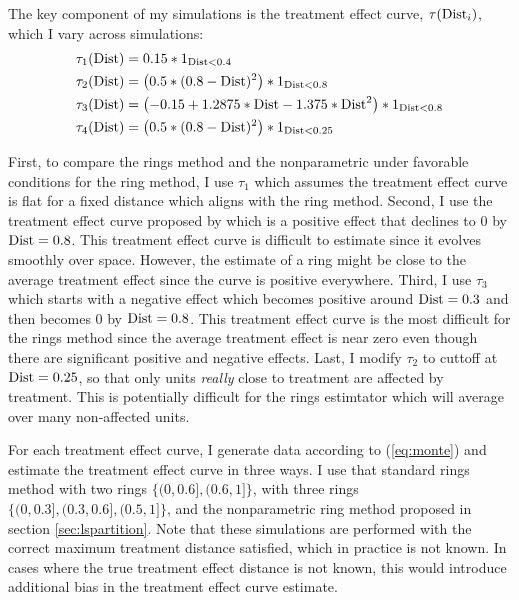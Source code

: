 The key component of my simulations is the treatment effect curve, $\tau(\text{Dist}_i)$, which I vary across simulations:
\begin{align*}
  \tau_1(\dist) &= 0.15 * \one_{\dist < 0.4} \\
  \tau_2(\dist) &= \left( 0.5 * (0.8 - \dist)^2 \right) * 1_{\dist < 0.8} \\
  \tau_3(\dist) &= \left( -0.15 + 1.2875 * \dist - 1.375 * \dist^2 \right) * 1_{\dist < 0.8} \\
  \tau_4(\dist) &= \left( 0.5 * (0.8 - \dist)^2 \right) * 1_{\dist < 0.25} \\
\end{align*}

First, to compare the rings method and the nonparametric under favorable conditions for the ring method, I use $\tau_1$ which assumes the treatment effect curve is flat for a fixed distance which aligns with the ring method. Second, I use the treatment effect curve proposed by \cite{diamond2019wants} which is a positive effect that declines to 0 by $\text{Dist} = 0.8$. This treatment effect curve is difficult to estimate since it evolves smoothly over space. However, the estimate of a ring might be close to the average treatment effect since the curve is positive everywhere. Third, I use $\tau_3$ which starts with a negative effect which becomes positive around $\text{Dist} = 0.3$ and then becomes 0 by $\text{Dist} = 0.8$. This treatment effect curve is the most difficult for the rings method since the average treatment effect is near zero even though there are significant positive and negative effects. Last, I modify $\tau_2$ to cuttoff at $\text{Dist} = 0.25$, so that only units \textit{really} close to treatment are affected by treatment. This is potentially difficult for the rings estimtator which will average over many non-affected units.

For each treatment effect curve, I generate data according to (\ref{eq:monte}) and estimate the treatment effect curve in three ways. I use that standard rings method with two rings $\{(0, 0.6], (0.6,1] \}$, with three rings $\{(0, 0.3], (0.3, 0.6], (0.5,1] \}$, and the nonparametric ring method proposed in section \ref{sec:lspartition}. Note that these simulations are performed with the correct maximum treatment distance satisfied, which in practice is not known. In cases where the true treatment effect distance is not known, this would introduce additional bias in the treatment effect curve estimate. 

